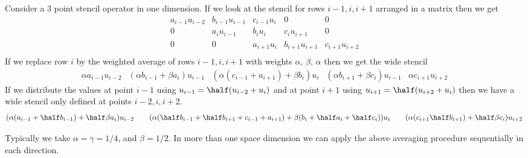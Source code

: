 \documentclass{article}
\begin{document}
Consider a 3 point stencil operator in one dimension. If we look at the stencil for
rows $i-1,i,i+1$ arranged in a matrix then we get
\[
   \begin{matrix}
   a_{i-1}u_{i-2} & b_{i-1}u_{i-1} & c_{i-1} u_i  & 0              & 0 \\
       0          & a_i u_{i-1}    & b_i u_i      & c_i u_{i+1}    & 0\\
       0          &       0        & a_{i+1} u_i  & b_{i+1}u_{i+1} & c_{i+1}u_{i+2} \\
    \end{matrix}
\]
If we replace row $i$ by the weighted average of rows $i-1,i,i+1$ with weights $\alpha$, $\beta$, $\alpha$
then we get the wide stencil
\[
   \begin{matrix}
     \alpha a_{i-1}u_{i-2} & 
         (\alpha b_{i-1}+\beta a_i)u_{i-1}  &
         (\alpha( c_{i-1} + a_{i+1}) + \beta b_i ) u_i &
         (\alpha b_{i+1}+\beta c_i)u_{i-1}  &
     \alpha c_{i+1}u_{i+2} 
    \end{matrix}
\]
If we distribute the values at point $i-1$ using $u_{i-1}=\half( u_{i-2}+u_i )$ and at point $i+1$
using $u_{i+1}=\half( u_{i+2}+u_i )$ then we have a wide stencil only defined at points
$i-2,i,i+2$.
\[
   \begin{matrix}
     ( \alpha(a_{i-1}+\half b_{i-1}) +\half\beta a_i) u_{i-2} & 
         &
         (\alpha( \half b_{i-1} + \half b_{i+1} + c_{i-1} + a_{i+1}) + \beta (b_i+\half a_i+\half c_i) ) u_i &
         &
     (\alpha( c_{i+1}\half b_{i+1}) + \half\beta c_i)u_{i+2} 
    \end{matrix}
\]

Typically we take $\alpha=\gamma=1/4$, and $\beta=1/2$.  In more than one space dimension we can
apply the above averaging procedure sequentially in each direction. 
\end{document}
